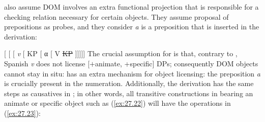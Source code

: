 \documentclass[output=paper]{langsci/langscibook}
\begin{document}
\ea\label{ex:27.20} 
    \z
\z
\textcite{OrdonezRoca2017} also assume DOM
involves an extra functional projection that is responsible for a checking
relation necessary for certain objects. They assume 
proposal of prepositions as probes, and they consider \emph{a} is a preposition
that is inserted in the derivation:

\ea\label{ex:27.21}
    [ [ [ \emph{v}   [ KP
     [ α [ V \sout{KP} ]]]]]
    \vspace{2em}
\z
The crucial assumption for \citeauthor{OrdonezRoca2017} is that, contrary to ,
Spanish \emph{v} does not license [$+$animate, +specific] DPs; consequently
DOM objects cannot stay in situ: 
has an extra mechanism for object licensing: the preposition \emph{a} is
crucially present in the numeration.  Additionally, the derivation has the same
steps as causatives in ; in other words, all transitive
constructions in  bearing an animate or specific object such as
(\ref{ex:27.22}) will have the operations in (\ref{ex:27.23}):
\end{document}
